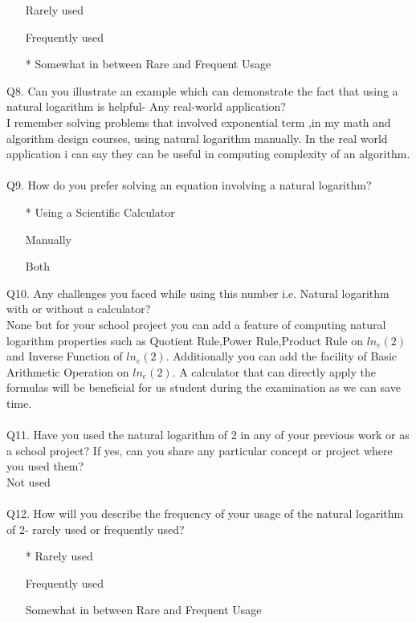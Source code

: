 \documentclass[12pt]{article}
\makeatletter
\newcommand*{\radiobutton}{%
  \@ifstar{\@radiobutton0}{\@radiobutton1}%
}
\newcommand*{\@radiobutton}[1]{%
  \begin{tikzpicture}
    \pgfmathsetlengthmacro\radius{height("X")/2}
    \draw[radius=\radius] circle;
    \ifcase#1 \fill[radius=.6*\radius] circle;\fi
  \end{tikzpicture}%
}
\makeatother
\begin{document}
\begin{itemize}
\item[\radiobutton] Rarely used
\item[\radiobutton] Frequently used
\item[\radiobutton*] Somewhat in between Rare and Frequent Usage
\end{itemize}
Q8. Can you illustrate an example which can demonstrate the fact that using a natural logarithm is helpful- Any real-world application?\\
I remember solving problems that involved exponential term ,in my math and algorithm design courses, using natural logarithm manually. In the real world application i can say they can be useful in computing complexity of an algorithm.\\\\
Q9. How do you prefer solving an equation involving a natural logarithm? 
\begin{itemize}
\item[\radiobutton*] Using a Scientific Calculator
\item[\radiobutton] Manually
\item[\radiobutton] Both
\end{itemize}
Q10. Any challenges you faced while using this number i.e. Natural logarithm with or without a calculator?\\
None but for your school project you can add a feature of computing natural logarithm properties such as Quotient Rule,Power Rule,Product Rule on $ln_{e}(2)$ and Inverse Function of $ln_{e}(2)$. Additionally you can add the facility of Basic Arithmetic Operation on $ln_{e}(2)$. A calculator that can directly apply the formulas will be beneficial for us student during the examination as we can save time.\\\\
Q11. Have you used the natural logarithm of 2 in any of your previous work or as a school project? If yes, can you share any particular concept or project where you used them?\\
Not used\\\\
Q12. How will you describe the frequency of your usage of the natural logarithm of 2- rarely used or frequently used?\\
\begin{itemize}
\item[\radiobutton*] Rarely used
\item[\radiobutton] Frequently used
\item[\radiobutton] Somewhat in between Rare and Frequent Usage
\end{itemize}
\end{document}
